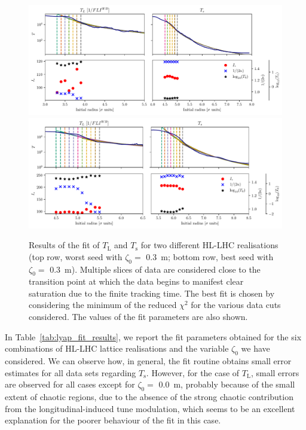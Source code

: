 \begin{figure}[htb]
    \centering
    \includegraphics[width=1\textwidth]{6_lhc_dynamic_indicators/figs/fit_l_time_bad.pdf}
    \includegraphics[width=1\textwidth]{6_lhc_dynamic_indicators/figs/fit_l_time_best.pdf}
    \caption{Results of the fit of $T_\mathrm{L}$ and $T_\mathrm{s}$ for two different HL-LHC realisations (top row, worst seed with $\zeta_0=$ \SI{0.3}{\meter}; bottom row, best seed with $\zeta_0=$ \SI{0.3}{\meter}). Multiple slices of data are considered close to the transition point at which the data begins to manifest clear saturation due to the finite tracking time. The best fit is chosen by considering the minimum of the reduced $\chi^2$ for the various data cuts considered. The values of the fit parameters are also shown.}
    \label{fig:the_lyap_fit}
\end{figure}

In Table~\ref{tab:lyap_fit_results}, we report the fit parameters obtained for the six combinations of HL-LHC lattice realisations and the variable $\zeta_0$ we have considered. We can observe how, in general, the fit routine obtains small error estimates for all data sets regarding $T_\mathrm{s}$. However, for the case of $T_\mathrm{L}$, small errors are observed for all cases except for $\zeta_0 =$ \SI{0.0}{\metre}, probably because of the small extent of chaotic regions, due to the absence of the strong chaotic contribution from the longitudinal-induced tune modulation, which seems to be an excellent explanation for the poorer behaviour of the fit in this case.

